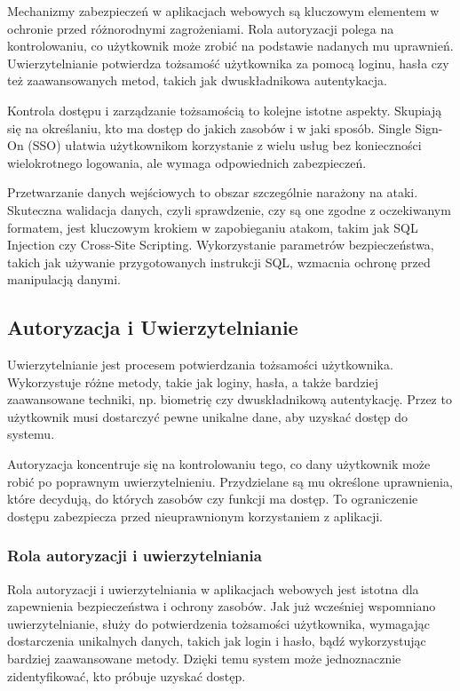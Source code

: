 \documentclass[12pt,twoside]{article}
\begin{document}
Mechanizmy zabezpieczeń w aplikacjach webowych są kluczowym elementem w ochronie przed różnorodnymi zagrożeniami. Rola autoryzacji polega na kontrolowaniu, co użytkownik może zrobić na podstawie nadanych mu uprawnień. Uwierzytelnianie potwierdza tożsamość użytkownika za pomocą loginu, hasła czy też zaawansowanych metod, takich jak dwuskładnikowa autentykacja.

Kontrola dostępu i zarządzanie tożsamością to kolejne istotne aspekty. Skupiają się na określaniu, kto ma dostęp do jakich zasobów i w jaki sposób. Single Sign-On (SSO) ułatwia użytkownikom korzystanie z wielu usług bez konieczności wielokrotnego logowania, ale wymaga odpowiednich zabezpieczeń.

Przetwarzanie danych wejściowych to obszar szczególnie narażony na ataki. Skuteczna walidacja danych, czyli sprawdzenie, czy są one zgodne z oczekiwanym formatem, jest kluczowym krokiem w zapobieganiu atakom, takim jak SQL Injection czy Cross-Site Scripting. Wykorzystanie parametrów bezpieczeństwa, takich jak używanie przygotowanych instrukcji SQL, wzmacnia ochronę przed manipulacją danymi.

\subsection{Autoryzacja i Uwierzytelnianie}

Uwierzytelnianie jest procesem potwierdzania tożsamości użytkownika. Wykorzystuje różne metody, takie jak loginy, hasła, a także bardziej zaawansowane techniki, np. biometrię czy dwuskładnikową autentykację. Przez to użytkownik musi dostarczyć pewne unikalne dane, aby uzyskać dostęp do systemu.

Autoryzacja koncentruje się na kontrolowaniu tego, co dany użytkownik może robić po poprawnym uwierzytelnieniu. Przydzielane są mu określone uprawnienia, które decydują, do których zasobów czy funkcji ma dostęp. To ograniczenie dostępu zabezpiecza przed nieuprawnionym korzystaniem z aplikacji.

\subsubsection{Rola autoryzacji i uwierzytelniania}

Rola autoryzacji i uwierzytelniania w aplikacjach webowych jest istotna dla zapewnienia bezpieczeństwa i ochrony zasobów. Jak już wcześniej wspomniano uwierzytelnianie, służy do potwierdzenia tożsamości użytkownika, wymagając dostarczenia unikalnych danych, takich jak login i hasło, bądź wykorzystując bardziej zaawansowane metody. Dzięki temu system może jednoznacznie zidentyfikować, kto próbuje uzyskać dostęp.
\end{document}
